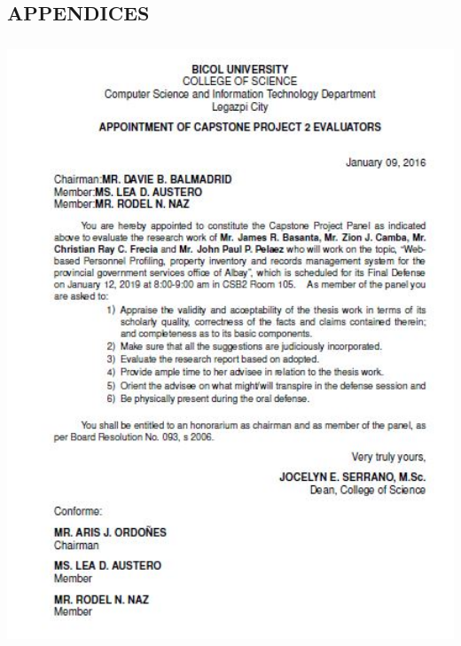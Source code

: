 
\clearpage
\thispagestyle{empty}
    \vspace*{\fill}
        \begin{center}
            \begin{minipage}{.5\textwidth}
                
                    \section{APPENDICES}
             
            \end{minipage}
        \end{center}
    \vfill
\clearpage

\newpage

\begin{center} 
	\textbf{}
	\includegraphics[width=14cm,height=18cm]{image/a1.JPG}
\end{center}

